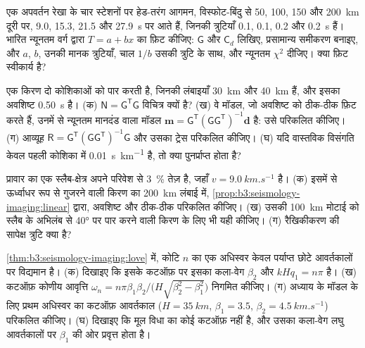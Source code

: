 \begin{exercise}[$\star\star$]\label{exo:b3:seismology-imaging:7}
एक अपवर्तन रेखा के चार स्टेशनों पर हेड-तरंग आगमन, विस्फोट-बिंदु से 50, 100, 150 और
\qty{200}{km} दूरी पर, 9.0, 15.3, 21.5 और \qty{27.9}{s} पर आते हैं, जिनकी त्रुटियाँ
0.1, 0.1, 0.2 और \qty{0.2}{s} हैं। भारित न्यूनतम वर्ग द्वारा $T = a + bx$ का फ़िट कीजिए:
$\mathsf G$ और $\mathsf C_d$ लिखिए, प्रसामान्य समीकरण बनाइए, और
$a$, $b$, उनकी मानक त्रुटियाँ, चाल $1/b$ उसकी त्रुटि के साथ, और
न्यूनतम $\chi^2$ दीजिए। क्या फ़िट स्वीकार्य है?
\end{exercise}

\begin{exercise}[$\star\star$]\label{exo:b3:seismology-imaging:8}
एक किरण दो कोशिकाओं को पार करती है, जिनकी लंबाइयाँ \qty{30}{km} और \qty{40}{km} हैं, और
इसका अवशिष्ट \qty{0.50}{s} है। (क) $\mathsf N = \mathsf G^{\mathsf T}
\mathsf G$ विचित्र क्यों है? (ख) वे मॉडल, जो अवशिष्ट को ठीक-ठीक फ़िट करते हैं, उनमें से
न्यूनतम मानदंड वाला मॉडल $\mathbf m = \mathsf G^{\mathsf T}(\mathsf G\mathsf
G^{\mathsf T})^{-1}\mathbf d$ है: उसे परिकलित कीजिए। (ग) आव्यूह
$\mathsf R = \mathsf G^{\mathsf T}(\mathsf G\mathsf G^{\mathsf T})^{-1}\mathsf G$
और उसका ट्रेस परिकलित कीजिए। (घ) यदि वास्तविक विसंगति केवल पहली
कोशिका में \qty{0.01}{s.km^{-1}} है, तो क्या पुनर्प्राप्त होता है?
\end{exercise}

\begin{exercise}[$\star\star$]\label{exo:b3:seismology-imaging:9}
प्रावार का एक स्लैब-क्षेत्र अपने परिवेश से \qty{3}{\percent} तेज़ है,
जहाँ $v = \qty{9.0}{km.s^{-1}}$ है। (क) इसमें से ऊर्ध्वाधर रूप से गुजरने वाली किरण का
\qty{200}{km} लंबाई में, \cref{prop:b3:seismology-imaging:linear} द्वारा, अवशिष्ट
और ठीक-ठीक परिकलित कीजिए। (ख) उसकी \qty{100}{km} मोटाई को स्लैब के अभिलंब से
\ang{40} पर पार करने वाली किरण के लिए भी यही कीजिए। (ग) रैखिकीकरण की
सापेक्ष त्रुटि क्या है?
\end{exercise}

\begin{exercise}[$\star\star\star$]\label{exo:b3:seismology-imaging:10}
\cref{thm:b3:seismology-imaging:love} में, कोटि $n$ का एक अधिस्वर केवल
पर्याप्त छोटे आवर्तकालों पर विद्यमान है। (क) दिखाइए कि इसके कटऑफ़ पर इसका कला-वेग
$\beta_2$ और $kHq_1 = n\pi$ है। (ख) कटऑफ़ कोणीय आवृत्ति
$\omega_n = n\pi\beta_1\beta_2/\bigl(H\sqrt{\beta_2^2 - \beta_1^2}\bigr)$ निगमित कीजिए।
(ग) अध्याय के मॉडल के लिए प्रथम अधिस्वर का कटऑफ़ आवर्तकाल
($H = \qty{35}{km}$, $\beta_1 = 3.5$, $\beta_2 = \qty{4.5}{km.s^{-1}}$) परिकलित कीजिए।
(घ) दिखाइए कि मूल विधा का कोई कटऑफ़ नहीं है, और उसका कला-वेग
लघु आवर्तकालों पर $\beta_1$ की ओर प्रवृत्त होता है।
\end{exercise}

